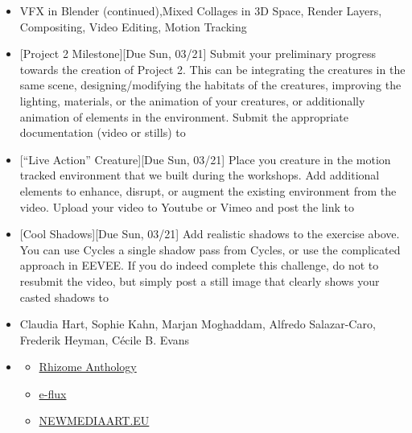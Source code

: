 \def\dMon{Mon, 03/15}
\def\dTues{Tues, 03/16}
\def\dWed{Wed, 03/17}
\def\dThur{Thur, 03/18}
\def\dFri{Fri, 03/19}
\def\dSat{Sat, 03/20}
\def\dSun{Sun, 03/21}
\placeDate

\begin{itemize}[noitemsep,topsep=0pt,leftmargin=*]
    \item {} VFX in Blender (continued),Mixed Collages in 3D Space, Render Layers, Compositing, Video Editing, Motion Tracking
    \item {}[Project 2 Milestone][Due \dSun] Submit your preliminary progress towards the creation of Project 2. This can be integrating the creatures in the same scene, designing/modifying the habitats of the creatures, improving the lighting, materials, or the animation of your creatures, or additionally animation of elements in the environment. Submit the appropriate documentation (video or stills) to \discordE
    \item {}[``Live Action'' Creature][Due \dSun] Place you creature in the motion tracked environment that we built during the workshops. Add additional elements to enhance, disrupt, or augment the existing environment from the video. Upload your video to Youtube or Vimeo and post the link to \discordE
    \item {}[Cool Shadows][Due \dSun] Add realistic shadows to the exercise above. You can use Cycles a single shadow pass from Cycles, or use the complicated approach in EEVEE. If you do indeed complete this challenge, do not to resubmit the video, but simply post a still image that clearly shows your casted shadows to \discordC
    \item {} Claudia Hart, Sophie Kahn, Marjan Moghaddam, Alfredo Salazar-Caro, Frederik Heyman, Cécile B. Evans
    \item {}
          \begin{resenv}
              \begin{itemize}
                  \item \href{https://anthology.rhizome.org/}{Rhizome Anthology}
                  \item \href{https://www.e-flux.com/journal/}{e-flux}
                  \item \href{https://www.newmediaart.eu/}{NEWMEDIAART.EU}
              \end{itemize}
          \end{resenv}
\end{itemize}